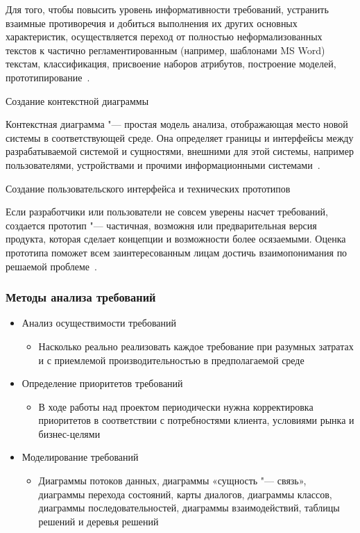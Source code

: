 \documentclass{../industrial-development}
\begin{document}
\lecturenotes

Для того, чтобы повысить уровень информативности требований, устранить взаимные противоречия и добиться выполнения их других основных характеристик, осуществляется переход от полностью неформализованных текстов к частично регламентированным (например, шаблонами MS Word) текстам, классификация, присвоение наборов атрибутов, построение моделей, прототипирование~\cite[с.~40]{Maglinec}.

\alert{Создание контекстной диаграммы}

Контекстная диаграмма "--- простая модель анализа, отображающая место новой системы в соответствующей среде. Она определяет границы и интерфейсы между разрабатываемой системой и сущностями, внешними для этой системы, например пользователями, устройствами и прочими информационными системами~\cite[с.~48]{Wiegers}.

\alert{Создание пользовательского интерфейса и технических прототипов}

Если разработчики или пользователи не совсем уверены насчет требований, создается прототип "--- частичная, возможня или предварительная версия продукта, которая сделает концепции и возможности более осязаемыми. Оценка прототипа поможет всем заинтересованным лицам достичь взаимопонимания по решаемой проблеме~\cite[с.~48]{Wiegers}.


\begin{frame} \frametitle{Методы анализа требований}
\begin{itemize}
\item  \alert{Анализ осуществимости требований} 
\begin{itemize}
\item Насколько реально реализовать каждое требование при разумных затратах и с приемлемой производительностью в предполагаемой среде
\end{itemize}
\item \alert{Определение приоритетов требований} 
\begin{itemize}
\item В ходе работы над проектом периодически нужна корректировка приоритетов в соответствии с потребностями клиента, условиями рынка и бизнес-целями
\end{itemize}
\item \alert{Моделирование требований} 
\begin{itemize}
\item Диаграммы потоков данных, диаграммы «сущность "--- связь», диаграммы перехода состояний, карты диалогов, диаграммы классов, диаграммы последовательностей, диаграммы взаимодействий, таблицы решений и деревья решений
\end{itemize}
\end{itemize}
\end{frame}
\end{document}
